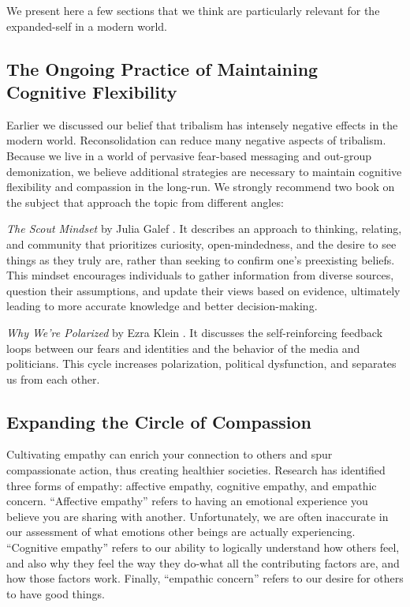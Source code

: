\documentclass[12pt,letterpaper]{article}
\begin{document}
We present here a few sections that we think are particularly relevant for the expanded-self in a modern world.
\subsection{The Ongoing Practice of Maintaining Cognitive Flexibility}
Earlier we discussed our belief that tribalism has intensely negative effects in the modern world. Reconsolidation can reduce many negative aspects of tribalism. Because we live in a world of pervasive fear-based messaging and out-group demonization, we believe additional strategies are necessary to maintain cognitive flexibility and compassion in the long-run. We strongly recommend two book on the subject that approach the topic from different angles:

\textit{The Scout Mindset} by Julia Galef \cite{galefScoutMindset}. It describes an approach to thinking, relating, and community that prioritizes curiosity, open-mindedness, and the desire to see things as they truly are, rather than seeking to confirm one's preexisting beliefs. This mindset encourages individuals to gather information from diverse sources, question their assumptions, and update their views based on evidence, ultimately leading to more accurate knowledge and better decision-making.

\textit{Why We're Polarized} by Ezra Klein \cite{klein2020Polarized}. It discusses the self-reinforcing feedback loops between our fears and identities and the behavior of the media and politicians. This cycle increases polarization, political dysfunction, and separates us from each other.

\subsection{Expanding the Circle of Compassion}
\label{sec:circle}
Cultivating empathy can enrich your connection to others and spur compassionate action, thus creating healthier societies. Research has identified three forms of empathy: affective empathy, cognitive empathy, and empathic concern. “Affective empathy” refers to having an emotional experience you believe you are sharing with another. Unfortunately, we are often inaccurate in our assessment of what emotions other beings are actually experiencing. “Cognitive empathy” refers to our ability to logically understand how others feel, and also why they feel the way they do-what all the contributing factors are, and how those factors work. Finally, “empathic concern” refers to our desire for others to have good things.
\end{document}
